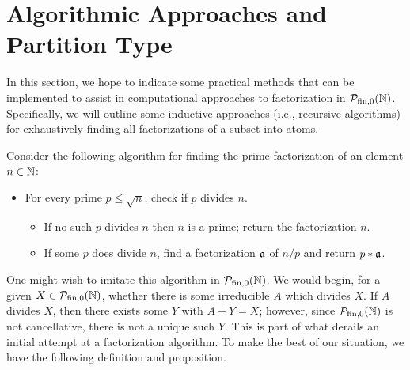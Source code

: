 







\section{Algorithmic Approaches and Partition Type} \label{sec:algorithms}

In this section, we hope to indicate some practical methods that can be implemented to assist in computational approaches to factorization in $\PN$.
Specifically, we will outline some inductive approaches (i.e., recursive algorithms) for exhaustively finding all factorizations of a subset into atoms.

Consider the following algorithm for finding the prime factorization of an element $n\in \NN$:
\begin{itemize}
	\item For every prime $p \le \sqrt{n}$, check if $p$ divides $n$.
	\begin{itemize}
		\item If no such $p$ divides $n$ then $n$ is a prime; return the factorization $n$.
		\item If some $p$ does divide $n$, find a factorization $\aa$ of $n/p$ and return $p * \aa$.
	\end{itemize}
\end{itemize}
One might wish to imitate this algorithm in $\PN$.
We would begin, for a given $X \in \PN$, whether there is some irreducible $A$ which divides $X$.
If $A$ divides $X$, then there exists some $Y$ with $A + Y = X$; however, since $\PN$ is not cancellative, there is not a unique such $Y$.
This is part of what derails an initial attempt at a factorization algorithm.
To make the best of our situation, we have the following definition and proposition. 

